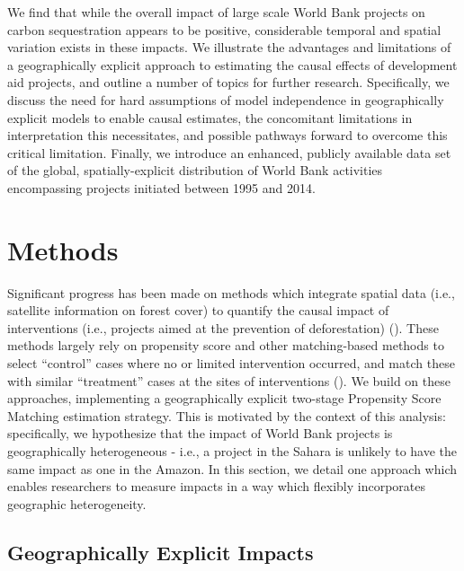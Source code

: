 \documentclass{article}\usepackage[]{graphicx}\usepackage[]{color}
\newenvironment{knitrout}{}{}  %
\begin{document}
\begin{knitrout}
We find that while the overall impact of large scale World Bank projects on carbon sequestration appears to be positive, considerable temporal and spatial variation exists in these impacts.
We illustrate the advantages and limitations of a geographically explicit approach to estimating the causal effects of development aid projects, and outline a number of topics for further research.
Specifically, we discuss the need for hard assumptions of model independence in geographically explicit models to enable causal estimates, the concomitant limitations in interpretation this necessitates, and possible pathways forward to overcome this critical limitation.
Finally, we introduce an enhanced, publicly available data set of the global, spatially-explicit distribution of World Bank activities encompassing projects initiated between 1995 and 2014.

\newpage
\section{Methods}

Significant progress has been made on methods which integrate spatial data (i.e., satellite information on forest cover) to quantify the causal impact of interventions (i.e., projects aimed at the prevention of deforestation) (\cite{nelson_effectiveness_2011}).  
These methods largely rely on propensity score and other matching-based methods to select ``control'' cases where no or limited intervention occurred, and match these with similar ``treatment'' cases at the sites of interventions (\cite{andam_measuring_2008}). 
We build on these approaches, implementing a geographically explicit two-stage Propensity Score Matching estimation strategy.
This is motivated by the context of this analysis: specifically, we hypothesize that the impact of World Bank projects is geographically heterogeneous - i.e., a project in the Sahara is unlikely to have the same impact as one in the Amazon.
In this section, we detail one approach which enables researchers to measure impacts in a way which flexibly incorporates geographic heterogeneity.


\subsection{Geographically Explicit Impacts}


\end{knitrout}
\end{document}

